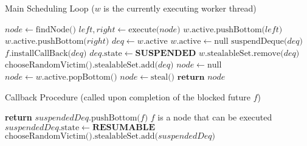 \documentclass[bsc,frontabs,singlespacing,parskip,deptreport,normalheadings]{infthesis}
\begin{document}
\begin{algorithm}
\caption{Main Scheduling Loop ($w$ is the currently executing worker thread)}
\label{alg:scheduling_loop}
\begin{algorithmic}[1]
         \label{line:loop}
            \State $node \gets \text{findNode()}$
            \State $left, right \gets \text{execute(}node\text{)}$
                \State $w \text{.active.pushBottom(}left\text{)}$
            \EndIf
                \State $w \text{.active.pushBottom(}right\text{)}$
            \EndIf
            \label{line:future_start} \label{line:blocked_future}
                \State $deq \gets w \text{.active}$
                \State $w \text{.active} \gets \text{null}$
                \State $\text{suspendDeque(}deq\text{)}$
                \State $f\text{.installCallBack(} deq \text{)}$
                    \label{line:install_callback}
            \EndIf \label{line:future_end}
        \EndWhile
    \EndFunction
     \label{line:deque_suspension}
        \State $deq\text{.state} \gets \textbf{SUSPENDED}$
        \State $ w \text{.stealableSet.remove(} deq \text{)}$
            \State $ \text{chooseRandomVictim().stealableSet.add(} deq \text{)}$
        \EndIf
    \EndFunction
        \State $node \gets \text{null}$
            \State $node \gets w \text{.active.popBottom()}$
        \EndIf
         \label{line:no_work}
            \State $node \gets \text{steal()}$
        \EndIf
        \State $\textbf{return } node$
    \EndFunction
\end{algorithmic}
\end{algorithm}

\begin{algorithm}
\caption{Callback Procedure (called upon completion of the blocked future $f$)}
\label{alg:callback}
\begin{algorithmic}[1]
     \label{line:callback}
            \label{line:sus_check}
            \State \textbf{return}
        \EndIf
        \State $suspendedDeq \text{.pushBottom(} f \text{)}$ \Comment $f$ is a node
            that can be executed
        \State $suspendedDeq\text{.state} \gets \textbf{RESUMABLE}$
            \State $\text{chooseRandomVictim().stealableSet.add(} suspendedDeq
                \text{)}$
        \EndIf
    \EndFunction
\end{algorithmic}
\end{algorithm}
\end{document}
